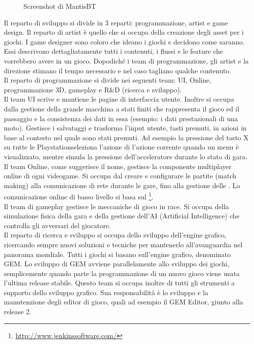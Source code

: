 \begin{figure}
	\centering
	\caption{Screenshot di MantisBT}
	\label{fig:screenshot-mantis}
\end{figure}

Il reparto di sviluppo si divide in 3 reparti: programmazione, artist e game design. Il reparto di artist è quello che si occupa della creazione degli asset per i giochi. I game designer sono coloro che ideano i giochi e decidono come saranno. Essi descrivono dettagliatamente tutti i contenuti, i flussi e le feature che vorrebbero avere in un gioco. Dopodiché i team di programmazione, gli artist e la direzione stimano il tempo necessario e nel caso tagliano qualche contenuto.\\

Il reparto di programmazione si divide nei seguenti team: UI, Online, programmazione 3D, gameplay e R\&D (ricerca e sviluppo).\\

Il team UI scrive e mantiene le pagine di interfaccia utente. Inoltre si occupa dalla gestione della grande macchina a stati finiti che rappresenta il gioco ed il passaggio e la consistenza dei dati in essa (esempio: i dati prestazionali di una moto). Gestisce i salvataggi e trasforma l'input utente, tasti premuti, in azioni in base al contesto nel quale sono stati premuti. Ad esempio la pressione del tasto X su tutte le Playstation\textregistered seleziona l'azione di l'azione corrente quando un menu è visualizzato, mentre simula la pressione dell'acceleratore durante lo stato di gara.\\

Il team Online, come suggerisce il nome, gestisce la componente multiplayer online di ogni videogame. Si occupa dal creare e configurare le partite (match making) alla comunicazione di rete durante le gare, fino alla gestione delle . La comunicazione online di basso livello si basa sul  \footnote{\url{http://www.jenkinssoftware.com/}}.\\

Il team di gameplay gestisce le meccaniche di gioco in race. Si occupa della simulazione fisica della gara e della gestione dell'AI (Artificial Intelligence) che controlla gli avversari del giocatore.\\

Il reparto di ricerca e sviluppo si occupa dello sviluppo dell'engine grafico, ricercando sempre nuovi soluzioni e tecniche per mantenerlo all'avanguardia nel panorama mondiale. Tutti i giochi si basano sull'engine grafico, denominato GEM. Lo sviluppo di GEM avviene parallelamente allo sviluppo dei giochi, semplicemente quando parte la programmazione di un nuovo gioco viene usata l'ultima release stabile. Questo team si occupa inoltre di tutti gli strumenti a supporto dello sviluppo grafico. Sua responsabilità è lo sviluppo e la manutenzione degli editor di gioco, quali ad esempio il GEM Editor, giunto alla release 2.\\

